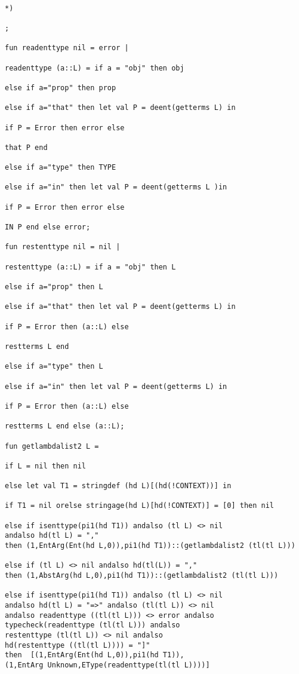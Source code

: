 \documentclass{article}
\begin{document}
\begin{verbatim}

*)

;

fun readenttype nil = error |

readenttype (a::L) = if a = "obj" then obj

else if a="prop" then prop

else if a="that" then let val P = deent(getterms L) in 

if P = Error then error else

that P end

else if a="type" then TYPE

else if a="in" then let val P = deent(getterms L )in 

if P = Error then error else

IN P end else error;

fun restenttype nil = nil |

restenttype (a::L) = if a = "obj" then L

else if a="prop" then L

else if a="that" then let val P = deent(getterms L) in 

if P = Error then (a::L) else

restterms L end

else if a="type" then L

else if a="in" then let val P = deent(getterms L) in 

if P = Error then (a::L) else

restterms L end else (a::L);

fun getlambdalist2 L =

if L = nil then nil

else let val T1 = stringdef (hd L)[(hd(!CONTEXT))] in

if T1 = nil orelse stringage(hd L)[hd(!CONTEXT)] = [0] then nil

else if isenttype(pi1(hd T1)) andalso (tl L) <> nil 
andalso hd(tl L) = "," 
then (1,EntArg(Ent(hd L,0)),pi1(hd T1))::(getlambdalist2 (tl(tl L)))

else if (tl L) <> nil andalso hd(tl(L)) = "," 
then (1,AbstArg(hd L,0),pi1(hd T1))::(getlambdalist2 (tl(tl L)))

else if isenttype(pi1(hd T1)) andalso (tl L) <> nil 
andalso hd(tl L) = "=>" andalso (tl(tl L)) <> nil 
andalso readenttype ((tl(tl L))) <> error andalso
typecheck(readenttype (tl(tl L))) andalso
restenttype (tl(tl L)) <> nil andalso
hd(restenttype ((tl(tl L)))) = "]" 
then  [(1,EntArg(Ent(hd L,0)),pi1(hd T1)),
(1,EntArg Unknown,EType(readenttype(tl(tl L))))]


\end{verbatim}
\end{document}
